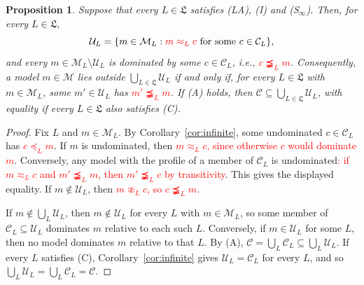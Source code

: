 \documentclass[11pt]{article}
\newtheorem{proposition}[theorem]{Proposition}
\theoremstyle{definition}
\theoremstyle{remark}
\newcommand{\M}{\mathcal M}
\newcommand{\C}{\mathcal C}
\newcommand{\U}{\mathcal U}
\begin{document}
\newpage

\begin{proposition}\label{prop:permissible}
Suppose that every $L\in\mathfrak L$ satisfies (LA), (I) and (S$_\infty$). Then, for every $L\in\mathfrak L$,
\[
 \U_L=\{m\in\M_L:\textcolor{red}{m\approx_L c}\text{ for some }c\in\C_L\},
\]
and every $m\in\M_L\setminus\U_L$ is dominated by some $c\in\C_L$, \textit{i.e.}, \textcolor{red}{$c\precneqq_L m$}. Consequently, a model $m\in\M$ lies outside $\bigcup_{L\in\mathfrak L}\U_L$ if and only if, for every $L\in\mathfrak L$ with $m\in\M_L$, some $m'\in\U_L$ has \textcolor{red}{$m'\precneqq_L m$}. If (A) holds, then $\C\subseteq\bigcup_{L\in\mathfrak L}\U_L$, with equality if every $L\in\mathfrak L$ also satisfies (C).
\end{proposition}
\begin{proof}
Fix $L$ and $m\in\M_L$. By Corollary~\ref{cor:infinite}, some undominated $c\in\C_L$ has \textcolor{red}{$c\preceq_L m$}. If $m$ is undominated, then \textcolor{red}{$m\approx_L c$, since otherwise $c$ would dominate $m$}. Conversely, any model with the profile of a member of $\C_L$ is undominated\textcolor{red}{: if $m\approx_L c$ and $m'\precneqq_L m$, then $m'\precneqq_L c$ by transitivity}. This gives the displayed equality. If $m\notin\U_L$, then \textcolor{red}{$m\not\approx_L c$, so $c\precneqq_L m$}.

If $m\notin\bigcup_L\U_L$, then $m\notin\U_L$ for every $L$ with $m\in\M_L$, so some member of $\C_L\subseteq\U_L$ dominates $m$ relative to each such $L$. Conversely, if $m\in\U_L$ for some $L$, then no model dominates $m$ relative to that $L$. By (A), $\C=\bigcup_L\C_L\subseteq\bigcup_L\U_L$. If every $L$ satisfies (C), Corollary~\ref{cor:infinite} gives $\U_L=\C_L$ for every $L$, and so $\bigcup_L\U_L=\bigcup_L\C_L=\C$.
\end{proof}
\end{document}
